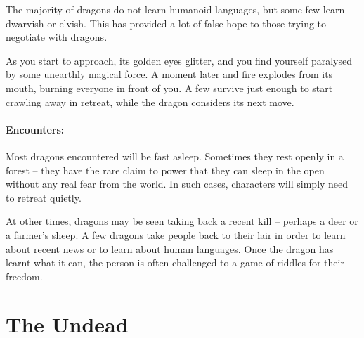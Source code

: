 \begin{multicols}{2}
The majority of dragons do not learn humanoid languages, but some few learn dwarvish or elvish.
This has provided a lot of false hope to those trying to negotiate with dragons.

\begin{boxtext}

  As you start to approach, its golden eyes glitter, and you find yourself paralysed by some unearthly magical force.
A moment later and fire explodes from its mouth, burning everyone in front of you.
  A few survive just enough to start crawling away in retreat, while the dragon considers its next move.

\end{boxtext}

\paragraph{Encounters:} Most dragons encountered will be fast asleep.
Sometimes they rest openly in a forest -- they have the rare claim to power that they can sleep in the open without any real fear from the world.
In such cases, characters will simply need to retreat quietly.

At other times, dragons may be seen taking back a recent kill -- perhaps a deer or a farmer's sheep.
A few dragons take people back to their lair in order to learn about recent news or to learn about human languages.
Once the dragon has learnt what it can, the person is often challenged to a game of riddles for their freedom.  

\dragon

\end{multicols}

\section[The Undead]{The Undead \D}

